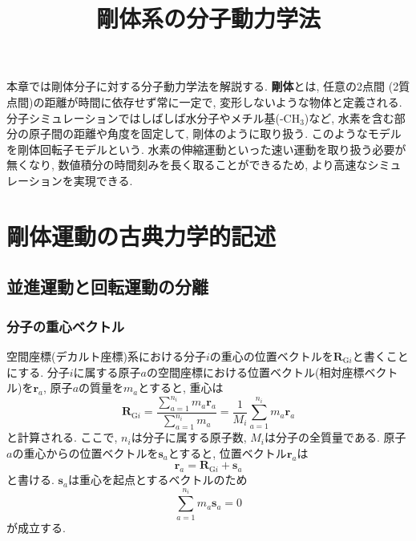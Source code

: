 





\title{剛体系の分子動力学法}
\maketitle
本章では剛体分子に対する分子動力学法を解説する.
\textbf{剛体}とは, 任意の2点間 (2質点間)の距離が時間に依存せず常に一定で, 変形しないような物体と定義される.
分子シミュレーションではしばしば水分子やメチル基(-CH$_{3}$)など, 水素を含む部分の原子間の距離や角度を固定して, 剛体のように取り扱う.
このようなモデルを剛体回転子モデルという.
水素の伸縮運動といった速い運動を取り扱う必要が無くなり, 数値積分の時間刻みを長く取ることができるため,
より高速なシミュレーションを実現できる.

\section{剛体運動の古典力学的記述}

\subsection{並進運動と回転運動の分離}
\subsubsection{分子の重心ベクトル}

空間座標(デカルト座標)系における分子$i$の重心の位置ベクトルを$\bm{R}_{\mathrm{G}i}$と書くことにする.
分子$i$に属する原子$a$の空間座標における位置ベクトル(相対座標ベクトル)を$\bm{r}_{a}$, 原子$a$の質量を$m_{a}$とすると, 重心は
\begin{equation}
  \bm{R}_{\mathrm{G}i}
  =
  \frac{\sum_{a=1}^{n_{i}} m_{a} \bm{r}_{a}}{\sum_{a=1}^{n_{i}} m_{a}}
  =
  \frac{1}{M_{i}}
  \sum_{a=1}^{n_{i}} m_{a} \bm{r}_{a}
  \label{Eq:Vector_CoM}
\end{equation}
と計算される. ここで, $n_{i}$は分子に属する原子数, $M_{i}$は分子の全質量である.
原子$a$の重心からの位置ベクトルを$\bm{s}_{a}$とすると, 位置ベクトル$\bm{r}_{a}$は
\begin{equation}
  \bm{r}_{a} = \bm{R}_{\mathrm{G}i} + \bm{s}_{a}
  \label{Eq:Vector_AtomPosition}
\end{equation}
と書ける. $\bm{s}_{a}$は重心を起点とするベクトルのため
\begin{equation}
  \sum_{a=1}^{n_{i}} m_{a} \bm{s}_{a} = 0
  \label{Eq:IEq_SiteVector}
\end{equation}
が成立する.




